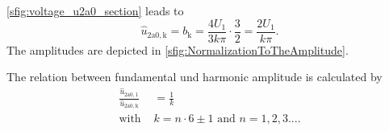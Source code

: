 \begin{solutionblock}
    

    \autoref{sfig:voltage_u2a0_section} leads to
    \begin{equation}
        \hat{u}_\mathrm{2a0,k} = b_\mathrm{k} = \frac{4U_{\mathrm{1}}}{3k\pi} \cdot \frac{3}{2}=\frac{2U_{\mathrm{1}}}{k\pi}.
        \label{eq:Ex07T2_FundamentelVoltage}
    \end{equation}   
    The amplitudes are depicted in \autoref{sfig:NormalizationToTheAmplitude}.
    
    \FloatBarrier
    The relation between fundamental und harmonic amplitude is calculated by
    \begin{equation}
        \begin{split}        
            \frac{\hat{u}_\mathrm{2a0,1}}{\hat{u}_\mathrm{2a0,k}} &= \frac{1}{k} \\
            \text{with } &k=n \cdot 6\pm1 \text{ and } n=1,2,3... .
        \end{split}         
    \end{equation}   
    \label{subtask:Ex07T2_FourierSeries}
 \end{solutionblock}

